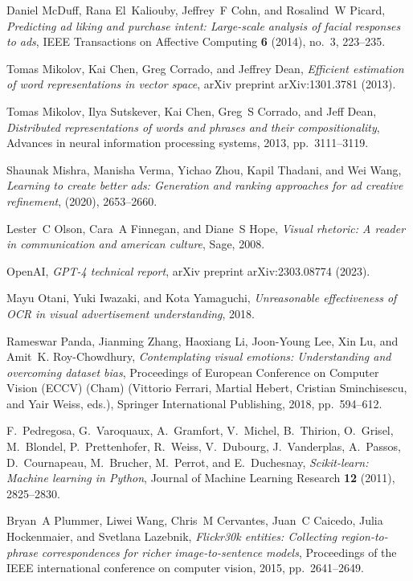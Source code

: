 \documentclass{zapiski}
\begin{document}
\begin{thebibliography}{10}
Daniel McDuff, Rana El~Kaliouby, Jeffrey~F Cohn, and Rosalind~W Picard,
  \emph{Predicting ad liking and purchase intent: Large-scale analysis of
  facial responses to ads}, IEEE Transactions on Affective Computing \textbf{6}
  (2014), no.~3, 223--235.

Tomas Mikolov, Kai Chen, Greg Corrado, and Jeffrey Dean, \emph{Efficient
  estimation of word representations in vector space}, arXiv preprint
  arXiv:1301.3781 (2013).

Tomas Mikolov, Ilya Sutskever, Kai Chen, Greg~S Corrado, and Jeff Dean,
  \emph{Distributed representations of words and phrases and their
  compositionality}, Advances in neural information processing systems, 2013,
  pp.~3111--3119.

Shaunak Mishra, Manisha Verma, Yichao Zhou, Kapil Thadani, and Wei Wang,
  \emph{Learning to create better ads: Generation and ranking approaches for ad
  creative refinement},  (2020), 2653--2660.

Lester~C Olson, Cara~A Finnegan, and Diane~S Hope, \emph{Visual rhetoric: A
  reader in communication and american culture}, Sage, 2008.

OpenAI, \emph{{GPT-4} technical report}, arXiv preprint arXiv:2303.08774
  (2023).

Mayu Otani, Yuki Iwazaki, and Kota Yamaguchi, \emph{Unreasonable effectiveness
  of {OCR} in visual advertisement understanding}, 2018.

Rameswar Panda, Jianming Zhang, Haoxiang Li, Joon-Young Lee, Xin Lu, and
  Amit~K. Roy-Chowdhury, \emph{Contemplating visual emotions: Understanding and
  overcoming dataset bias}, Proceedings of European Conference on Computer
  Vision (ECCV) (Cham) (Vittorio Ferrari, Martial Hebert, Cristian
  Sminchisescu, and Yair Weiss, eds.), Springer International Publishing, 2018,
  pp.~594--612.

F.~Pedregosa, G.~Varoquaux, A.~Gramfort, V.~Michel, B.~Thirion, O.~Grisel,
  M.~Blondel, P.~Prettenhofer, R.~Weiss, V.~Dubourg, J.~Vanderplas, A.~Passos,
  D.~Cournapeau, M.~Brucher, M.~Perrot, and E.~Duchesnay, \emph{Scikit-learn:
  Machine learning in {P}ython}, Journal of Machine Learning Research
  \textbf{12} (2011), 2825--2830.

Bryan~A Plummer, Liwei Wang, Chris~M Cervantes, Juan~C Caicedo, Julia
  Hockenmaier, and Svetlana Lazebnik, \emph{Flickr30k entities: Collecting
  region-to-phrase correspondences for richer image-to-sentence models},
  Proceedings of the IEEE international conference on computer vision, 2015,
  pp.~2641--2649.


\end{thebibliography}
\end{document}
